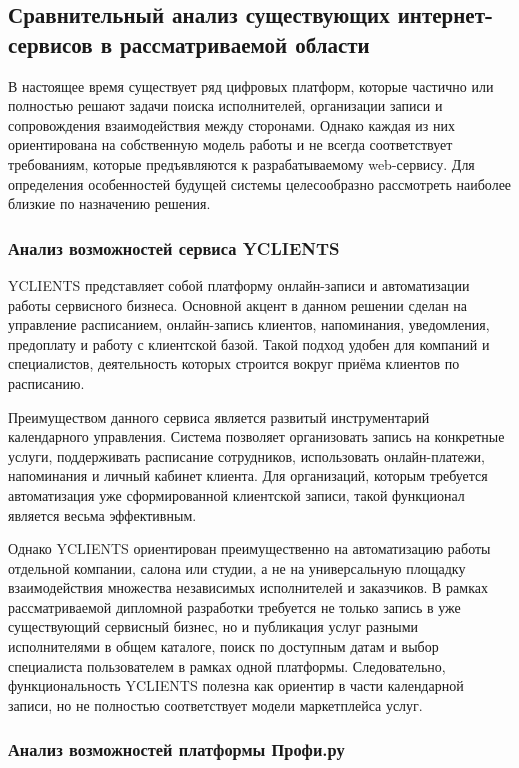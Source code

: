 \subsection{Сравнительный анализ существующих интернет-сервисов в рассматриваемой области}

В настоящее время существует ряд цифровых платформ, которые частично или полностью решают задачи поиска исполнителей, организации записи и сопровождения взаимодействия между сторонами. Однако каждая из них ориентирована на собственную модель работы и не всегда соответствует требованиям, которые предъявляются к разрабатываемому web-сервису. Для определения особенностей будущей системы целесообразно рассмотреть наиболее близкие по назначению решения.

\subsubsection{Анализ возможностей сервиса YCLIENTS}

YCLIENTS представляет собой платформу онлайн-записи и автоматизации работы сервисного бизнеса. Основной акцент в данном решении сделан на управление расписанием, онлайн-запись клиентов, напоминания, уведомления, предоплату и работу с клиентской базой. Такой подход удобен для компаний и специалистов, деятельность которых строится вокруг приёма клиентов по расписанию.

Преимуществом данного сервиса является развитый инструментарий календарного управления. Система позволяет организовать запись на конкретные услуги, поддерживать расписание сотрудников, использовать онлайн-платежи, напоминания и личный кабинет клиента. Для организаций, которым требуется автоматизация уже сформированной клиентской записи, такой функционал является весьма эффективным.

Однако YCLIENTS ориентирован преимущественно на автоматизацию работы отдельной компании, салона или студии, а не на универсальную площадку взаимодействия множества независимых исполнителей и заказчиков. В рамках рассматриваемой дипломной разработки требуется не только запись в уже существующий сервисный бизнес, но и публикация услуг разными исполнителями в общем каталоге, поиск по доступным датам и выбор специалиста пользователем в рамках одной платформы. Следовательно, функциональность YCLIENTS полезна как ориентир в части календарной записи, но не полностью соответствует модели маркетплейса услуг.

\subsubsection{Анализ возможностей платформы Профи.ру}

